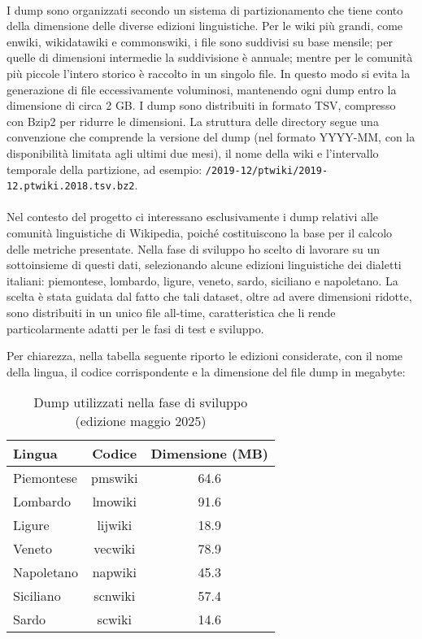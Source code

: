 \paragraph{}
I dump sono organizzati secondo un sistema di partizionamento che tiene conto della dimensione delle diverse edizioni linguistiche. Per le wiki più grandi, come enwiki, wikidatawiki e commonswiki, i file sono suddivisi su base mensile; per quelle di dimensioni intermedie la suddivisione è annuale; mentre per le comunità più piccole l’intero storico è raccolto in un singolo file. In questo modo si evita la generazione di file eccessivamente voluminosi, mantenendo ogni dump entro la dimensione di circa 2 GB.
I dump sono distribuiti in formato TSV, compresso con Bzip2 per ridurre le dimensioni.
La struttura delle directory segue una convenzione che comprende la versione del dump (nel formato YYYY-MM, con la disponibilità limitata agli ultimi due mesi), il nome della wiki e l’intervallo temporale della partizione, ad esempio: \texttt{/2019-12/ptwiki/2019-12.ptwiki.2018.tsv.bz2}.
\paragraph{}
Nel contesto del progetto ci interessano esclusivamente i dump relativi alle comunità linguistiche di Wikipedia, poiché costituiscono la base per il calcolo delle metriche presentate. Nella fase di sviluppo ho scelto di lavorare su un sottoinsieme di questi dati, selezionando alcune edizioni linguistiche dei dialetti italiani: piemontese, lombardo, ligure, veneto, sardo, siciliano e napoletano. La scelta è stata guidata dal fatto che tali dataset, oltre ad avere dimensioni ridotte, sono distribuiti in un unico file all-time, caratteristica che li rende particolarmente adatti per le fasi di test e sviluppo.

Per chiarezza, nella tabella seguente riporto le edizioni considerate, con il nome della lingua, il codice corrispondente e la dimensione del file dump in megabyte:
\begin{table}[htbp]
    \centering
    \begin{tabular}{|l|c|c|}
        \hline
        \textbf{Lingua} & \textbf{Codice} & \textbf{Dimensione (MB)} \\
        \hline
        Piemontese & pmswiki & 64.6 \\
        Lombardo   & lmowiki & 91.6 \\
        Ligure     & lijwiki & 18.9 \\
        Veneto     & vecwiki & 78.9 \\
        Napoletano & napwiki & 45.3 \\
        Siciliano  & scnwiki & 57.4 \\
        Sardo      & scwiki  & 14.6 \\
        \hline
    \end{tabular}
    \caption{Dump utilizzati nella fase di sviluppo (edizione maggio 2025)}
    \label{tab:dumps_sviluppo}
\end{table}


